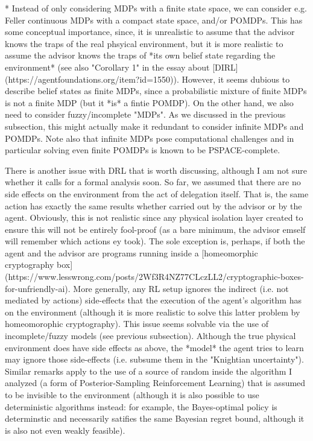 \documentclass[a4paper]{article}
\begin{document}
* Instead of only considering MDPs with a finite state space, we can consider e.g. Feller continuous MDPs with a compact state space, and/or POMDPs. This has some conceptual importance, since, it is unrealistic to assume that the advisor knows the traps of the real phsyical environment, but it is more realistic to assume the advisor knows the traps of *its own belief state regarding the environment* (see also "Corollary 1" in the essay about [DIRL](https://agentfoundations.org/item?id=1550)). However, it seems dubious to describe belief states as finite MDPs, since a probabilistic mixture of finite MDPs is not a finite MDP (but it *is* a fintie POMDP). On the other hand, we also need to consider fuzzy/incomplete "MDPs". As we discussed in the previous subsection, this might actually make it redundant to consider infinite MDPs and POMDPs. Note also that infinite MDPs pose computational challenges and in particular solving even finite POMDPs is known to be PSPACE-complete.

There is another issue with DRL that is worth discussing, although I am not sure whether it calls for a formal analysis soon. So far, we assumed that there are no side effects on the environment from the act of delegation itself. That is, the same action has exactly the same results whether carried out by the advisor or by the agent. Obviously, this is not realistic since any physical isolation layer created to ensure this will not be entirely fool-proof (as a bare minimum, the advisor emself will remember which actions ey took). The sole exception is, perhaps, if both the agent and the advisor are programs running inside a [homeomorphic cryptography box](https://www.lesswrong.com/posts/2Wf3R4NZ77CLczLL2/cryptographic-boxes-for-unfriendly-ai). More generally, any RL setup ignores the indirect (i.e. not mediated by actions) side-effects that the execution of the agent's algorithm has on the environment (although it is more realistic to solve this latter problem by homeomorophic cryptography). This issue seems solvable via the use of incomplete/fuzzy models (see previous subsection). Although the true physical environment does have side effects as above, the *model* the agent tries to learn may ignore those side-effects (i.e. subsume them in the "Knightian uncertainty"). Similar remarks apply to the use of a source of random inside the algorithm I analyzed (a form of Posterior-Sampling Reinforcement Learning) that is assumed to be invisible to the environment (although it is also possible to use deterministic algorithms instead: for example, the Bayes-optimal policy is determinstic and necessarily satifies the same Bayesian regret bound, although it is also not even weakly feasible).
\end{document}
